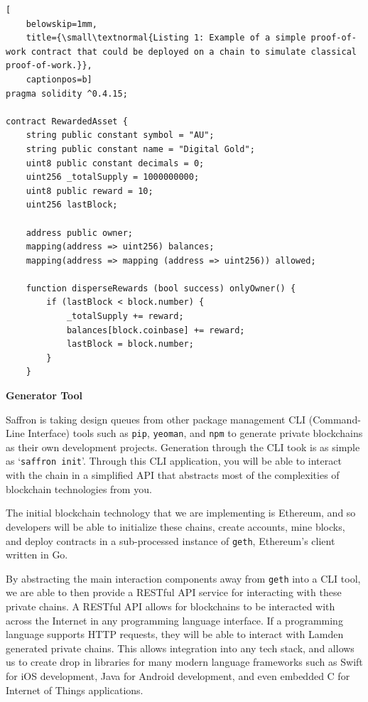 \documentclass{%
	article}
\begin{document}
\begin{lstlisting}[
	belowskip=1mm,
	title={\small\textnormal{Listing 1: Example of a simple proof-of-work contract that could be deployed on a chain to simulate classical proof-of-work.}},
	captionpos=b]
pragma solidity ^0.4.15;

contract RewardedAsset {
    string public constant symbol = "AU";
    string public constant name = "Digital Gold";
    uint8 public constant decimals = 0;
    uint256 _totalSupply = 1000000000;
    uint8 public reward = 10;
    uint256 lastBlock;

    address public owner;
    mapping(address => uint256) balances;
    mapping(address => mapping (address => uint256)) allowed;

    function disperseRewards (bool success) onlyOwner() {
        if (lastBlock < block.number) {
            _totalSupply += reward;
            balances[block.coinbase] += reward;
            lastBlock = block.number;
        }
    }

\end{lstlisting}

\begin{center}
\textbf{Generator Tool}
\end{center}

Saffron is taking design queues from other package management CLI (Command-Line Interface) tools such as \texttt{pip}\cite{pip}, \texttt{yeoman}\cite{yeoman}, and \texttt{npm}\cite{npm} to generate private blockchains as their own development projects. Generation through the CLI took is as simple as ‘\texttt{saffron init}’. Through this CLI application, you will be able to interact with the chain in a simplified API that abstracts most of the complexities of blockchain technologies from you.

The initial blockchain technology that we are implementing is Ethereum, and so developers will be able to initialize these chains, create accounts, mine blocks, and deploy contracts in a sub-processed instance of \texttt{geth}, Ethereum’s client written in Go.

By abstracting the main interaction components away from \texttt{geth} into a CLI tool, we are able to then provide a RESTful API service for interacting with these private chains. A RESTful API allows for blockchains to be interacted with across the Internet in any programming language interface. If a programming language supports HTTP requests, they will be able to interact with Lamden generated private chains. This allows integration into any tech stack, and allows us to create drop in libraries for many modern language frameworks such as Swift for iOS development, Java for Android development, and even embedded C for Internet of Things applications.
\end{document}
